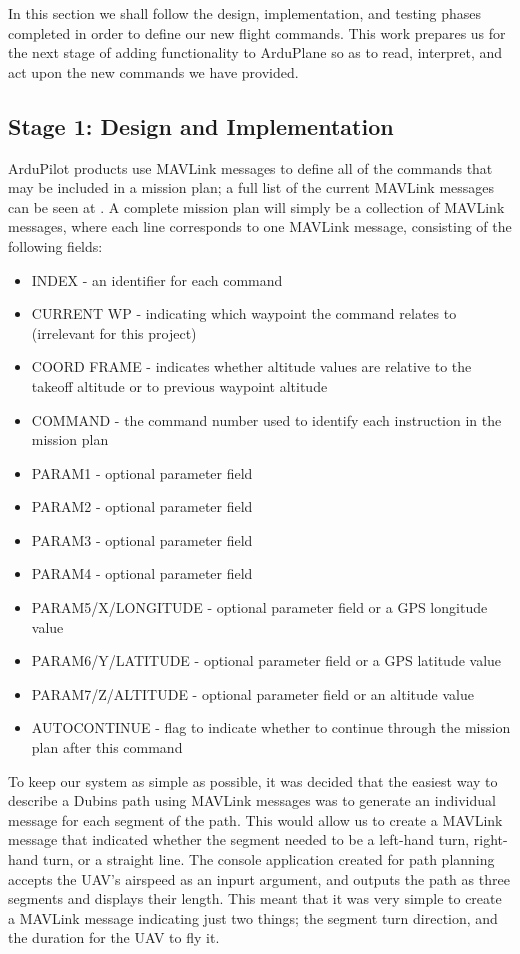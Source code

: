 In this section we shall follow the design, implementation, and testing phases completed in order to define our new flight commands. This work prepares us for the next stage of adding functionality to ArduPlane so as to read, interpret, and act upon the new commands we have provided. 

\subsection{Stage 1: Design and Implementation}
\label{task2:stage1:design}

ArduPilot products use MAVLink messages to define all of the commands that may be included in a mission plan; a full list of the current MAVLink messages can be seen at \cite{MavlinkMessages}. A complete mission plan will simply be a collection of MAVLink messages, where each line corresponds to one MAVLink message, consisting of the following fields:

\begin{itemize}
	\item INDEX - an identifier for each command
	\item CURRENT WP - indicating which waypoint the command relates to (irrelevant for this project)
	\item COORD FRAME - indicates whether altitude values are relative to the takeoff altitude or to previous waypoint altitude
	\item COMMAND - the command number used to identify each instruction in the mission plan
	\item PARAM1 - optional parameter field
	\item PARAM2 - optional parameter field
	\item PARAM3 - optional parameter field
	\item PARAM4 - optional parameter field
	\item PARAM5/X/LONGITUDE - optional parameter field or a GPS longitude value 
	\item PARAM6/Y/LATITUDE - optional parameter field or a GPS latitude value
	\item PARAM7/Z/ALTITUDE - optional parameter field or an altitude value
	\item AUTOCONTINUE - flag to indicate whether to continue through the mission plan after this command
\end{itemize}

 To keep our system as simple as possible, it was decided that the easiest way to describe a Dubins path using MAVLink messages was to generate an individual message for each segment of the path. This would allow us to create a MAVLink message that indicated whether the segment needed to be a left-hand turn, right-hand turn, or a straight line. The console application created for path planning accepts the UAV's airspeed as an inpurt argument, and outputs the path as three segments and displays their length. This meant that it was very simple to create a MAVLink message indicating just two things; the segment turn direction, and the duration for the UAV to fly it. 

